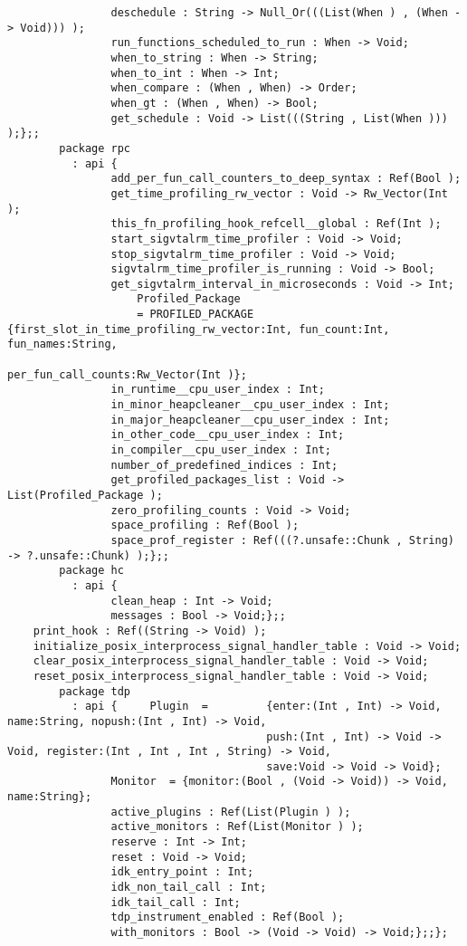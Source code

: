 \begin{verbatim}
                deschedule : String -> Null_Or(((List(When ) , (When -> Void))) );
                run_functions_scheduled_to_run : When -> Void;
                when_to_string : When -> String;
                when_to_int : When -> Int;
                when_compare : (When , When) -> Order;
                when_gt : (When , When) -> Bool;
                get_schedule : Void -> List(((String , List(When ))) );};;
        package rpc
          : api {
                add_per_fun_call_counters_to_deep_syntax : Ref(Bool );
                get_time_profiling_rw_vector : Void -> Rw_Vector(Int );
                this_fn_profiling_hook_refcell__global : Ref(Int );
                start_sigvtalrm_time_profiler : Void -> Void;
                stop_sigvtalrm_time_profiler : Void -> Void;
                sigvtalrm_time_profiler_is_running : Void -> Bool;
                get_sigvtalrm_interval_in_microseconds : Void -> Int;
                    Profiled_Package
                    = PROFILED_PACKAGE      {first_slot_in_time_profiling_rw_vector:Int, fun_count:Int, fun_names:String,
                                            per_fun_call_counts:Rw_Vector(Int )};
                in_runtime__cpu_user_index : Int;
                in_minor_heapcleaner__cpu_user_index : Int;
                in_major_heapcleaner__cpu_user_index : Int;
                in_other_code__cpu_user_index : Int;
                in_compiler__cpu_user_index : Int;
                number_of_predefined_indices : Int;
                get_profiled_packages_list : Void -> List(Profiled_Package );
                zero_profiling_counts : Void -> Void;
                space_profiling : Ref(Bool );
                space_prof_register : Ref(((?.unsafe::Chunk , String) -> ?.unsafe::Chunk) );};;
        package hc
          : api {
                clean_heap : Int -> Void;
                messages : Bool -> Void;};;
    print_hook : Ref((String -> Void) );
    initialize_posix_interprocess_signal_handler_table : Void -> Void;
    clear_posix_interprocess_signal_handler_table : Void -> Void;
    reset_posix_interprocess_signal_handler_table : Void -> Void;
        package tdp
          : api {     Plugin  =         {enter:(Int , Int) -> Void, name:String, nopush:(Int , Int) -> Void,
                                        push:(Int , Int) -> Void -> Void, register:(Int , Int , Int , String) -> Void,
                                        save:Void -> Void -> Void};
                Monitor  = {monitor:(Bool , (Void -> Void)) -> Void, name:String};
                active_plugins : Ref(List(Plugin ) );
                active_monitors : Ref(List(Monitor ) );
                reserve : Int -> Int;
                reset : Void -> Void;
                idk_entry_point : Int;
                idk_non_tail_call : Int;
                idk_tail_call : Int;
                tdp_instrument_enabled : Ref(Bool );
                with_monitors : Bool -> (Void -> Void) -> Void;};;};
\end{verbatim}
